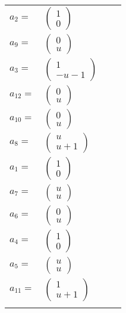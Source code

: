 \documentclass[1p]{elsarticle_modified}
\theoremstyle{definition}
\begin{document}
\begin{tabular}{m{7pt} m{180pt} m{7pt} m{180pt} }
\flushright $a_{2}=$&$\begin{pmatrix}1\\0\end{pmatrix}$ \\
\flushright $a_{9}=$&$\begin{pmatrix}0\\u\end{pmatrix}$ \\
\flushright $a_{3}=$&$\begin{pmatrix}1\\- u-1\end{pmatrix}$ \\
\flushright $a_{12}=$&$\begin{pmatrix}0\\u\end{pmatrix}$ \\
\flushright $a_{10}=$&$\begin{pmatrix}0\\u\end{pmatrix}$ \\
\flushright $a_{8}=$&$\begin{pmatrix}u\\u+1\end{pmatrix}$ \\
\flushright $a_{1}=$&$\begin{pmatrix}1\\0\end{pmatrix}$ \\
\flushright $a_{7}=$&$\begin{pmatrix}u\\u\end{pmatrix}$ \\
\flushright $a_{6}=$&$\begin{pmatrix}0\\u\end{pmatrix}$ \\
\flushright $a_{4}=$&$\begin{pmatrix}1\\0\end{pmatrix}$ \\
\flushright $a_{5}=$&$\begin{pmatrix}u\\u\end{pmatrix}$ \\
\flushright $a_{11}=$&$\begin{pmatrix}1\\u+1\end{pmatrix}$\\&\end{tabular}
\end{document}
